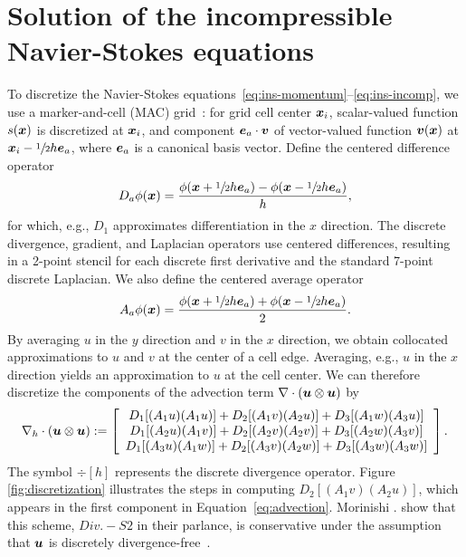 \section{Solution of the incompressible Navier-Stokes equations}\label{sec:ins}



To discretize the Navier-Stokes equations~\eqref{eq:ins-momentum}--\eqref{eq:ins-incomp},
we use a marker-and-cell (MAC) grid~\cite{Welch:1965jv}: for grid cell center $\boldsymbol{x}_i$,
scalar-valued function $s(\boldsymbol{x})$ is discretized at $\boldsymbol{x}_i$, and component $\boldsymbol{e}_a\cdot\boldsymbol{v}$
of vector-valued function $\boldsymbol{v}(\boldsymbol{x})$ at $\boldsymbol{x}_i - \sfrac12h\boldsymbol{e}_a$, where $\boldsymbol{e}_a$ is a
canonical basis vector. Define the centered difference operator
\begin{equation*}
    D_a\phi(\boldsymbol{x}) = \frac{\phi(\boldsymbol{x}+\sfrac12 h\boldsymbol{e}_a) - \phi(\boldsymbol{x}-\sfrac12 h\boldsymbol{e}_a)}{h},
\end{equation*}
for which, e.g., $D_1$ approximates differentiation in the $x$ direction. The discrete
divergence, gradient, and Laplacian operators use centered differences, resulting in a
2-point stencil for each discrete first derivative and the standard 7-point discrete
Laplacian. We also define the centered average operator
\begin{equation*}
    A_a\phi(\boldsymbol{x}) = \frac{\phi(\boldsymbol{x}+\sfrac12 h\boldsymbol{e}_a) + \phi(\boldsymbol{x}-\sfrac12 h\boldsymbol{e}_a)}2.
\end{equation*}
By averaging $u$ in the $y$ direction and $v$ in the $x$ direction, we obtain collocated
approximations to $u$ and $v$ at the center of a cell edge. Averaging, e.g., $u$ in the
$x$ direction yields an approximation to $u$ at the cell center. We can therefore
discretize the components of the advection term $\div(\u\otimes\u)$ by
\begin{equation}\label{eq:advection}
    \div[h](\u\otimes\u) := %
    \left[\begin{array}{c}
        D_1[(A_1 u) (A_1 u)] + D_2[(A_1 v) (A_2 u)] + D_3[(A_1 w) (A_3 u)] \\
        D_1[(A_2 u) (A_1 v)] + D_2[(A_2 v) (A_2 v)] + D_3[(A_2 w) (A_3 v)] \\
        D_1[(A_3 u) (A_1 w)] + D_2[(A_3 v) (A_2 w)] + D_3[(A_3 w) (A_3 w)]
    \end{array}\right].
\end{equation}
The symbol $\div[h]$ represents the discrete divergence operator.  Figure~%
\ref{fig:discretization} illustrates the steps in computing $D_2[(A_1 v)(A_2 u)]$, which
appears in the first component in Equation~\eqref{eq:advection}. Morinishi .
show that this scheme, $Div. - S2$ in their parlance, is conservative under the assumption
that $\boldsymbol{u}$ is discretely divergence-free~\cite{Morinishi:1998us}.

